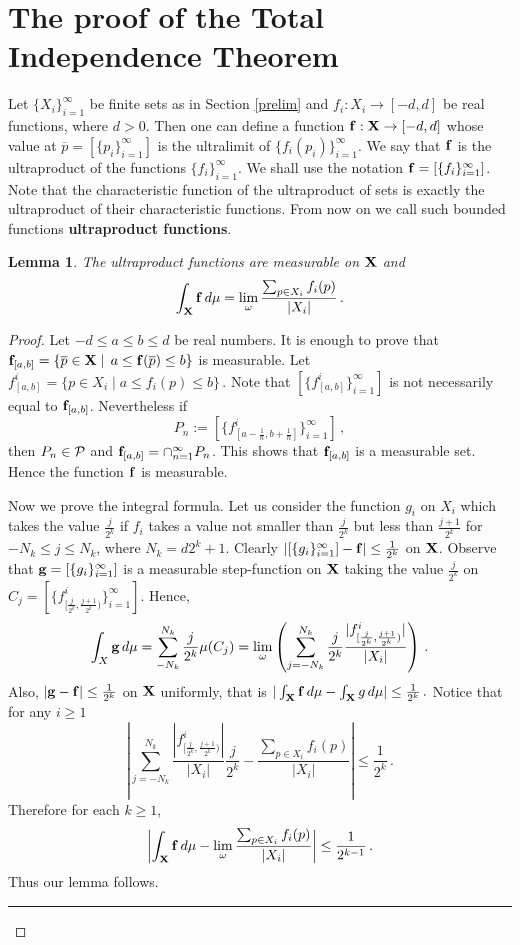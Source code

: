 \documentclass [11pt] {article}
\newcommand{\qed} {\hspace {0.1in} \rule {1.5mm} {3.5mm}}
\newtheorem{lemma}{Lemma}[section]
\def\limo{\lim_{\omega}}
\def\cP{\mbox{$\cal P$}}
\def\to{\rightarrow}
\def\xo{{\bf X}}
\def\muo{\mu}
\def\fb{{\bf f}}
\def\gb{{\bf g}}
\begin{document}
\section{The proof of the Total Independence Theorem}
\label{prooftotal}
Let $\{X_i\}_{i=1}^\infty$ be finite sets as in Section \ref{prelim} and
$f_i:X_i\to[-d,d]$ be real functions, where $d>0$. Then one can define
a function $\fb:\xo\to[-d,d]$ whose value at $\overline{p}=
[\{p_i\}^\infty_{i=1}]$
is the ultralimit of $\{f_i(p_i)\}^\infty_{i=1}$. We say that
$\fb$ is the ultraproduct of the functions $\{f_i\}^\infty_{i=1}$.
We shall use the notation $\fb=[\{f_i\}^\infty_{i=1}]$. Note that
the characteristic function of the ultraproduct of sets is exactly
the ultraproduct of their characteristic functions.
 From now on
we call such bounded functions {\bf ultraproduct functions}.
\begin{lemma}\label{ultralimitfunction}
The ultraproduct functions are  measurable on $\xo$ and
$$\int_{\xo} \fb \,d\muo=\limo \frac{\sum_{p\in X_i} f_i(p)}{|X_i|}\,.$$
\end{lemma}
\begin{proof} Let $-d\leq a\leq b\leq d$ be real numbers. It is enough to
prove that
$\fb_{[a,b]}=\{\overline{p}\in \xo\mid\,
a\leq \fb(\overline{p})\leq b\}$ is measurable.
Let $f_{[a,b]}^i=\{p\in X_i\mid a\leq f_i(p)\leq b\}\,.$
Note that $[\{f_{[a,b]}^i\}^\infty_{i=1}]$ is
not necessarily equal to $\fb_{[a,b]}$. Nevertheless if
$$P_n:= [\{f^i_{[a-\frac{1}{n},b+\frac{1}{n}]}\}^\infty_{i=1}]\,,$$
then $P_n\in\cP$ and $\fb_{[a,b]}=\cap^\infty_{n=1} P_n$. This shows that
$\fb_{[a,b]}$ is a measurable set. Hence the function $\fb$ is measurable.

\noindent
Now we prove the integral formula.
Let us consider the function $g_i$ on $X_i$ which takes the value
$\frac{j}{2^k}$ if $f_i$ takes a value not smaller than
$\frac{j}{2^k}$ but less than $\frac{j+1}{2^k}$ for
$-N_k\leq j \leq N_k$, where $N_k=d 2^k+1$.
Clearly
$ |[\{g_i\}^\infty_{i=1}] - \fb|\leq \frac{1}{2^k}$ on $\xo$. Observe that
$\gb=[\{g_i\}^\infty_{i=1}]$ is a measurable step-function on $\xo$ taking the
value $\frac{j}{2^k}$ on $C_j= [\{f^i_{[\frac{j}{2^k},
\frac{j+1}{2^k})}\}^\infty
_{i=1}]$. Hence,
$$\int_X \gb\,d\muo= \sum^{N_k}_{-N_k}\frac{j}{2^k}\mu(C_j)=
\limo\left(\sum^{N_k}_{j=-N_k} \frac{j} {2^k}
\frac{|f^i_{[\frac{j}{2^k},\frac{j+1}{2^k})}|}{|X_i|}\right)\,.$$
Also, $|\gb-\fb|\leq\frac{1}{2^k}$ on $\xo$ uniformly, that is
$|\int_{\xo} \fb\,d\muo - \int_{\xo} g\,d\muo|\leq \frac{1}{2^k}\,.$
Notice that for any $i\geq 1$
$$\left|\sum^{N_k}_{j=-N_k}
\frac{|f^i_{[\frac{j}{2^k},\frac{j+1}{2^k})}|}{|X_i|}\frac{j} {2^k}-
\frac{\sum_{p\in X_i} f_i(p)}{|X_i|}\right|\leq \frac{1}{2^k}\,.$$
Therefore for each $k\geq 1$,
$$\left|\int_\xo \fb\,d\muo-\limo 
\frac{\sum_{p\in X_i} f_i(p)}{|X_i|}\right|\leq
\frac{1}{2^{k-1}}\,.$$
Thus our lemma follows.
\qed
\end{proof} \vskip 0.2in
\end{document}
